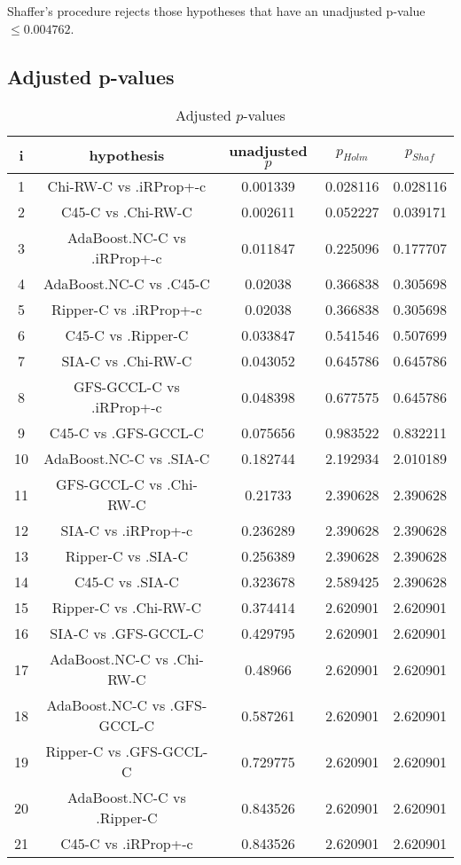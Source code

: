 \documentclass[a4paper,10pt]{article}
\begin{document}
Shaffer's procedure rejects those hypotheses that have an unadjusted p-value $\le0.004762$.

\pagebreak

\subsection{Adjusted p-values}

\begin{table}[!htp]
\centering\scriptsize
\begin{tabular}{ccccc}
i&hypothesis&unadjusted $p$&$p_{Holm}$&$p_{Shaf}$\\
\hline1&Chi-RW-C vs .iRProp+-c&0.001339&0.028116&0.028116\\
2&C45-C vs .Chi-RW-C&0.002611&0.052227&0.039171\\
3&AdaBoost.NC-C vs .iRProp+-c&0.011847&0.225096&0.177707\\
4&AdaBoost.NC-C vs .C45-C&0.02038&0.366838&0.305698\\
5&Ripper-C vs .iRProp+-c&0.02038&0.366838&0.305698\\
6&C45-C vs .Ripper-C&0.033847&0.541546&0.507699\\
7&SIA-C vs .Chi-RW-C&0.043052&0.645786&0.645786\\
8&GFS-GCCL-C vs .iRProp+-c&0.048398&0.677575&0.645786\\
9&C45-C vs .GFS-GCCL-C&0.075656&0.983522&0.832211\\
10&AdaBoost.NC-C vs .SIA-C&0.182744&2.192934&2.010189\\
11&GFS-GCCL-C vs .Chi-RW-C&0.21733&2.390628&2.390628\\
12&SIA-C vs .iRProp+-c&0.236289&2.390628&2.390628\\
13&Ripper-C vs .SIA-C&0.256389&2.390628&2.390628\\
14&C45-C vs .SIA-C&0.323678&2.589425&2.390628\\
15&Ripper-C vs .Chi-RW-C&0.374414&2.620901&2.620901\\
16&SIA-C vs .GFS-GCCL-C&0.429795&2.620901&2.620901\\
17&AdaBoost.NC-C vs .Chi-RW-C&0.48966&2.620901&2.620901\\
18&AdaBoost.NC-C vs .GFS-GCCL-C&0.587261&2.620901&2.620901\\
19&Ripper-C vs .GFS-GCCL-C&0.729775&2.620901&2.620901\\
20&AdaBoost.NC-C vs .Ripper-C&0.843526&2.620901&2.620901\\
21&C45-C vs .iRProp+-c&0.843526&2.620901&2.620901\\
\hline
\end{tabular}
\caption{Adjusted $p$-values}
\end{table}

\end{document}
